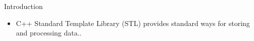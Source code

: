 \begin{frame}{Introduction}
    \begin{itemize}
        \item C++ Standard Template Library (STL) provides standard ways for storing and processing data..
    \end{itemize}
\end{frame}
